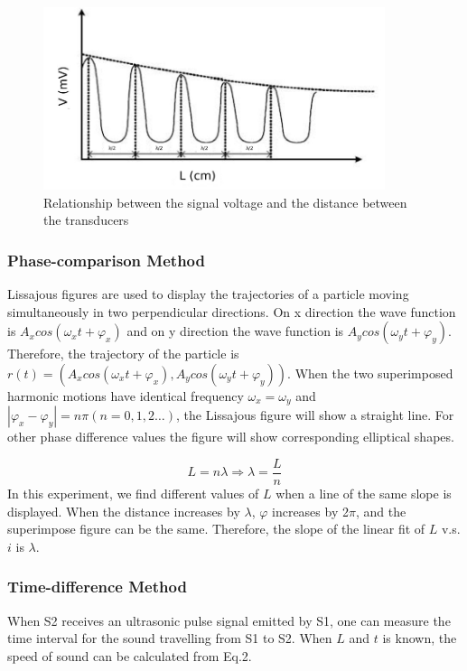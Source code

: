 \documentclass[12pt,a4paper]{article}
\begin{document}
\begin{figure}[H]
    \centering
    \includegraphics[width=10cm]{resonance.jpg}
    \caption{Relationship between the signal voltage and the distance between the transducers}
\end{figure}

\subsubsection{Phase-comparison Method}
Lissajous figures are used to display the trajectories of a particle moving simultaneously in two perpendicular directions. On x direction the wave function is $A_xcos⁡(\omega_xt+\varphi_x)$ and on y direction the wave function is $A_y cos⁡(\omega_yt+\varphi_y)$. Therefore, the trajectory of the particle is $r(t)=(A_xcos⁡(\omega_xt+\varphi_x),A_ycos⁡(\omega_y t+\varphi_y))$. When the two superimposed harmonic motions have identical frequency $\omega_x=\omega_y$ and $|\varphi_x-\varphi_y|=n\pi (n=0,1,2…)$, the Lissajous figure will show a straight line. For other phase difference values the figure will show corresponding elliptical shapes. \par 
\begin{equation}
    L=n\lambda \Longrightarrow \lambda=\frac{L}{n}
\end{equation}
In this experiment, we find different values of $L$ when a line of the same slope is displayed. When the distance increases by $\lambda$, $\varphi$ increases by 2$\pi$, and the superimpose figure can be the same. Therefore, the slope of the linear fit of $L$ v.s. $i$ is $\lambda$. 

\subsubsection{Time-difference Method}
When S2 receives an ultrasonic pulse signal emitted by S1, one can measure the time interval for the sound travelling from S1 to S2. When $L$ and $t$ is known, the speed of sound can be calculated from Eq.2.
\end{document}
